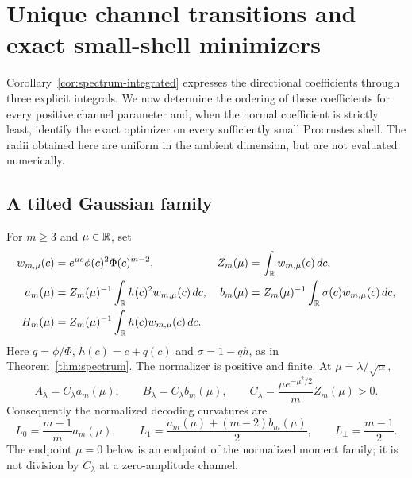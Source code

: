 \section{Unique channel transitions and exact small-shell minimizers}
\label{sec:new-results}

Corollary~\ref{cor:spectrum-integrated} expresses the directional coefficients through
three explicit integrals. We now determine the ordering of these coefficients for every positive
channel parameter and, when the normal coefficient is strictly least,
identify the exact optimizer on every sufficiently small Procrustes shell.
The radii obtained here are uniform in the ambient dimension, but are not
evaluated numerically.

\subsection{A tilted Gaussian family}

For $m\ge3$ and $\mu\in\mathbb R$, set
\begin{align}
 w_{m,\mu}(c)&=e^{\mu c}\phi(c)^2\Phi(c)^{m-2},&
 Z_m(\mu)&=\int_\mathbb R w_{m,\mu}(c)\,dc,\label{new:tilt}\\
 a_m(\mu)&=Z_m(\mu)^{-1}\int_\mathbb R h(c)^2w_{m,\mu}(c)\,dc,&
 b_m(\mu)&=Z_m(\mu)^{-1}\int_\mathbb R \sigma(c)w_{m,\mu}(c)\,dc,\notag\\
 H_m(\mu)&=Z_m(\mu)^{-1}\int_\mathbb R h(c)w_{m,\mu}(c)\,dc.\notag
\end{align}
Here $q=\phi/\Phi$, $h(c)=c+q(c)$ and $\sigma=1-qh$, as in
Theorem~\ref{thm:spectrum}. The normalizer is positive and finite.
At $\mu=\lambda/\sqrt\alpha$,
\[
 A_\lambda=C_\lambda a_m(\mu),\qquad
 B_\lambda=C_\lambda b_m(\mu),\qquad
 C_\lambda=\frac{\mu e^{-\mu^2/2}}m Z_m(\mu)>0.
\]
Consequently the normalized decoding curvatures are
\begin{equation}\label{new:normalized-curvatures}
 L_0=\frac{m-1}{m}a_m(\mu),\qquad
 L_1=\frac{a_m(\mu)+(m-2)b_m(\mu)}2,\qquad
 L_\perp=\frac{m-1}{2}.
\end{equation}
The endpoint $\mu=0$ below is an endpoint of the normalized moment family;
it is not division by $C_\lambda$ at a zero-amplitude channel.

